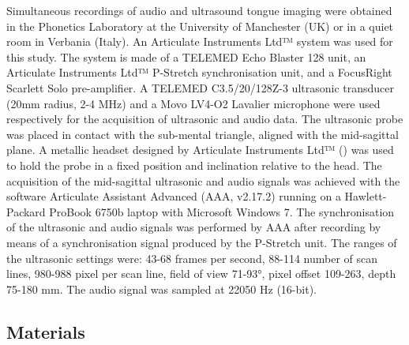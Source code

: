 \documentclass[12pt,]{article}
\begin{document}
Simultaneous recordings of audio and ultrasound tongue imaging were
obtained in the Phonetics Laboratory at the University of Manchester
(UK) or in a quiet room in Verbania (Italy). An Articulate Instruments
Ltd™ system was used for this study. The system is made of a TELEMED
Echo Blaster 128 unit, an Articulate Instruments Ltd™ P-Stretch
synchronisation unit, and a FocusRight Scarlett Solo pre-amplifier. A
TELEMED C3.5/20/128Z-3 ultrasonic transducer (20mm radius, 2-4 MHz) and
a Movo LV4-O2 Lavalier microphone were used respectively for the
acquisition of ultrasonic and audio data. The ultrasonic probe was
placed in contact with the sub-mental triangle, aligned with the
mid-sagittal plane. A metallic headset designed by Articulate
Instruments Ltd™ (\citeyear{articulate2008}) was used to hold the probe
in a fixed position and inclination relative to the head. The
acquisition of the mid-sagittal ultrasonic and audio signals was
achieved with the software Articulate Assistant Advanced (AAA, v2.17.2)
running on a Hawlett-Packard ProBook 6750b laptop with Microsoft Windows
7. The synchronisation of the ultrasonic and audio signals was performed
by AAA after recording by means of a synchronisation signal produced by
the P-Stretch unit. The ranges of the ultrasonic settings were: 43-68
frames per second, 88-114 number of scan lines, 980-988 pixel per scan
line, field of view 71-93°, pixel offset 109-263, depth 75-180 mm. The
audio signal was sampled at 22050 Hz (16-bit).

\hypertarget{materials}{%
\subsection{Materials}\label{materials}}
\end{document}
